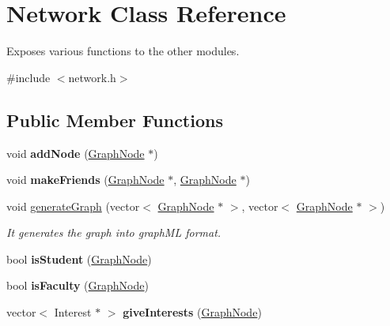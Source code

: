 \hypertarget{classNetwork}{\section{\-Network \-Class \-Reference}
\label{classNetwork}
}


\-Exposes various functions to the other modules.  




{\ttfamily \#include $<$network.\-h$>$}

\subsection*{\-Public \-Member \-Functions}
\begin{DoxyCompactItemize}
\item 
\hypertarget{classNetwork_af1d5854ff8e43d83623af7703ca95264}{void {\bfseries add\-Node} (\hyperlink{structGraphNode}{\-Graph\-Node} $\ast$)}\label{classNetwork_af1d5854ff8e43d83623af7703ca95264}

\item 
\hypertarget{classNetwork_a0981eb57d7ecb023f0abb63f5d9824e3}{void {\bfseries make\-Friends} (\hyperlink{structGraphNode}{\-Graph\-Node} $\ast$, \hyperlink{structGraphNode}{\-Graph\-Node} $\ast$)}\label{classNetwork_a0981eb57d7ecb023f0abb63f5d9824e3}

\item 
void \hyperlink{classNetwork_a8db93fc8e447bbc3ae3b0cd3b2e2ec1a}{generate\-Graph} (vector$<$ \hyperlink{structGraphNode}{\-Graph\-Node} $\ast$ $>$, vector$<$ \hyperlink{structGraphNode}{\-Graph\-Node} $\ast$ $>$)
\begin{DoxyCompactList}\small\item\em \-It generates the graph into graph\-M\-L format. \end{DoxyCompactList}\item 
\hypertarget{classNetwork_ae41b3c47c626a6a9774068efdb538999}{bool {\bfseries is\-Student} (\hyperlink{structGraphNode}{\-Graph\-Node})}\label{classNetwork_ae41b3c47c626a6a9774068efdb538999}

\item 
\hypertarget{classNetwork_a55b751fab14d4709d35c70e73363f7ba}{bool {\bfseries is\-Faculty} (\hyperlink{structGraphNode}{\-Graph\-Node})}\label{classNetwork_a55b751fab14d4709d35c70e73363f7ba}

\item 
\hypertarget{classNetwork_a455876eaf519fad1d86b702a438b1580}{vector$<$ \-Interest $\ast$ $>$ {\bfseries give\-Interests} (\hyperlink{structGraphNode}{\-Graph\-Node})}\label{classNetwork_a455876eaf519fad1d86b702a438b1580}


\end{DoxyCompactItemize}

